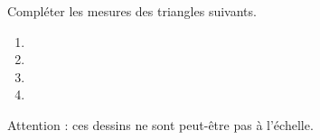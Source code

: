 
\begin{exercice}\label{exosmath-0842}

    Compléter les mesures des triangles suivants.

    \begin{multicols}{2}
        \begin{enumerate}
            \item
   
   \item
   
   \item
   
   \item
   
        \end{enumerate}
    \end{multicols}
    Attention : ces dessins ne sont peut-être pas à l'échelle.

\end{exercice}
